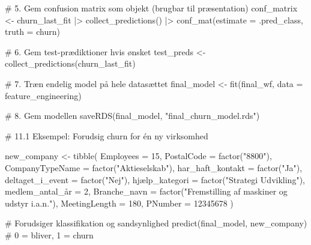 \documentclass[
  11pt,
  letterpaper,
  DIV=11,
  numbers=noendperiod]{scrartcl}
\newenvironment{Shaded}{\begin{snugshade}}{\end{snugshade}}
\newcommand{\AttributeTok}[1]{\textcolor[rgb]{0.40,0.45,0.13}{#1}}
\newcommand{\CommentTok}[1]{\textcolor[rgb]{0.37,0.37,0.37}{#1}}
\newcommand{\DecValTok}[1]{\textcolor[rgb]{0.68,0.00,0.00}{#1}}
\newcommand{\FunctionTok}[1]{\textcolor[rgb]{0.28,0.35,0.67}{#1}}
\newcommand{\NormalTok}[1]{\textcolor[rgb]{0.00,0.23,0.31}{#1}}
\newcommand{\OtherTok}[1]{\textcolor[rgb]{0.00,0.23,0.31}{#1}}
\newcommand{\SpecialCharTok}[1]{\textcolor[rgb]{0.37,0.37,0.37}{#1}}
\newcommand{\StringTok}[1]{\textcolor[rgb]{0.13,0.47,0.30}{#1}}
\begin{document}
\begin{Shaded}
\begin{Highlighting}[]
\CommentTok{\# 5. Gem confusion matrix som objekt (brugbar til præsentation)}
\NormalTok{conf\_matrix }\OtherTok{\textless{}{-}}\NormalTok{ churn\_last\_fit }\SpecialCharTok{|\textgreater{}} 
  \FunctionTok{collect\_predictions}\NormalTok{() }\SpecialCharTok{|\textgreater{}} 
  \FunctionTok{conf\_mat}\NormalTok{(}\AttributeTok{estimate =}\NormalTok{ .pred\_class, }\AttributeTok{truth =}\NormalTok{ churn)}

\CommentTok{\# 6. Gem test{-}prædiktioner hvis ønsket}
\NormalTok{test\_preds }\OtherTok{\textless{}{-}} \FunctionTok{collect\_predictions}\NormalTok{(churn\_last\_fit)}

\CommentTok{\# 7. Træn endelig model på hele datasættet}
\NormalTok{final\_model }\OtherTok{\textless{}{-}} \FunctionTok{fit}\NormalTok{(final\_wf, }\AttributeTok{data =}\NormalTok{ feature\_engineering)}

\CommentTok{\# 8. Gem modellen}
\FunctionTok{saveRDS}\NormalTok{(final\_model, }\StringTok{"final\_churn\_model.rds"}\NormalTok{)}


\CommentTok{\# 11.1 Eksempel: Forudsig churn for én ny virksomhed}


\NormalTok{new\_company }\OtherTok{\textless{}{-}} \FunctionTok{tibble}\NormalTok{(}
  \AttributeTok{Employees =} \DecValTok{15}\NormalTok{,}
  \AttributeTok{PostalCode =} \FunctionTok{factor}\NormalTok{(}\StringTok{"8800"}\NormalTok{),}
  \AttributeTok{CompanyTypeName =} \FunctionTok{factor}\NormalTok{(}\StringTok{"Aktieselskab"}\NormalTok{),}
  \AttributeTok{har\_haft\_kontakt =} \FunctionTok{factor}\NormalTok{(}\StringTok{"Ja"}\NormalTok{),}
  \AttributeTok{deltaget\_i\_event =} \FunctionTok{factor}\NormalTok{(}\StringTok{"Nej"}\NormalTok{),}
\NormalTok{  hjælp}\AttributeTok{\_kategori =} \FunctionTok{factor}\NormalTok{(}\StringTok{"Strategi Udvikling"}\NormalTok{),}
\NormalTok{  medlem\_antal\_å}\AttributeTok{r =} \DecValTok{2}\NormalTok{,}
  \AttributeTok{Branche\_navn =} \FunctionTok{factor}\NormalTok{(}\StringTok{"Fremstilling af maskiner og udstyr i.a.n."}\NormalTok{),}
  \AttributeTok{MeetingLength =} \DecValTok{180}\NormalTok{,}
  \AttributeTok{PNumber =} \DecValTok{12345678}
\NormalTok{)}

\CommentTok{\# Forudsiger klassifikation og sandsynlighed}
\FunctionTok{predict}\NormalTok{(final\_model, new\_company)                    }\CommentTok{\# 0 = bliver, 1 = churn}
\end{Highlighting}
\end{Shaded}
\end{document}
